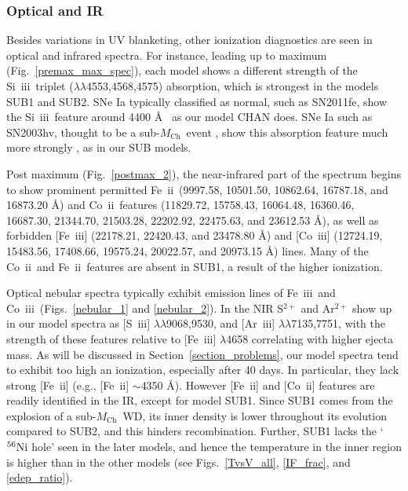 \documentclass[useAMS,usenatbib,useasmath]{mnras}
\newcommand{\Mch}{\hbox{$M_{\text{Ch}}$}}
\newcommand{\elem}[2][default]{$^{#1}{\rm #2}$}
\newcommand{\ariii}{\mbox{Ar~{\sc iii}}}
\newcommand{\skiii}{\mbox{Si~{\sc iii}}}
\newcommand{\feii}{\mbox{Fe~{\sc ii}}}
\newcommand{\feiii}{\mbox{Fe~{\sc iii}}}
\newcommand{\coii}{\mbox{Co~{\sc ii}}}
\newcommand{\coiii}{\mbox{Co~{\sc iii}}}
\newcommand{\siii}{\mbox{S~{\sc iii}}}
\newcommand{\lb}{$\lambda$}
\def\fig{Fig.}
\def\figs{Figs.}
\begin{document}
\subsubsection{Optical and IR} \label{optical_NIR}
Besides variations in UV blanketing, other ionization diagnostics are seen in optical and infrared spectra. For instance, leading up to maximum (\fig~\ref{premax_max_spec}), each model shows a different strength of the \skiii\ triplet (\lb\lb4553,4568,4575) absorption, which is strongest in the models SUB1 and SUB2. SNe Ia typically classified as normal, such as SN2011fe, show the \skiii\ feature around 4400 \AA\  \citep{Pereira2013} as our model CHAN does. SNe Ia such as SN2003hv, thought to be a sub-\Mch\ event \citep{Mazzali2011}, show this absorption feature much more strongly \citep{Leloudas2009}, as in our SUB models. 

Post maximum (\fig~\ref{postmax_2}), the near-infrared part of the spectrum begins to show prominent permitted \feii\ (9997.58, 10501.50, 10862.64, 16787.18, and 16873.20 \AA) and \coii\ features (11829.72, 15758.43, 16064.48, 16360.46, 16687.30, 21344.70, 21503.28, 22202.92, 22475.63, and 23612.53 \AA), as well as forbidden [\feiii] (22178.21, 22420.43, and 23478.80 \AA) and [\coiii] (12724.19, 15483.56, 17408.66, 19575.24, 20022.57, and 20973.15 \AA) lines. Many of the \coii\ and \feii\ features are absent in SUB1, a result of the higher ionization. 

Optical nebular spectra typically exhibit emission lines of \feiii\ and \coiii\ (\figs~\ref{nebular_1} and \ref{nebular_2}). In the NIR S$^{2+}$ and Ar$^{2+}$ show up in our model spectra as [\siii] \lb\lb9068,9530, and [\ariii] \lb\lb7135,7751, with the strength of these features relative to [\feiii] \lb4658 correlating with higher ejecta mass. As will be discussed in Section~\ref{section_problems}, our model spectra tend to exhibit too high an ionization, especially after 40 days. In particular, they lack strong [\feii] (e.g., [\feii] $\sim$4350 \AA). However [\feii] and [\coii] features are readily identified in the IR, except for model SUB1. Since SUB1 comes from the explosion of a sub-\Mch\ WD, its inner density is lower throughout its evolution compared to SUB2, and this hinders recombination. Further, SUB1 lacks the `\elem[56]{Ni} hole' seen in the later models, and hence the temperature in the inner region is higher than in the other models (see \figs~\ref{TvsV_all}, \ref{IF_frac}, and \ref{edep_ratio}).
\end{document}
